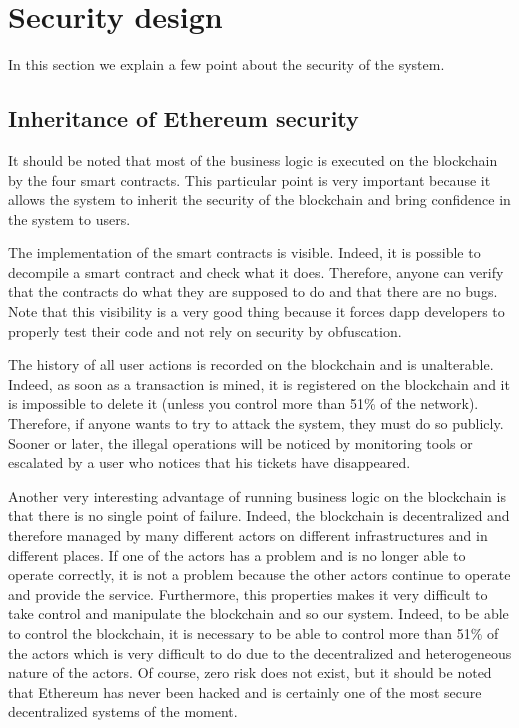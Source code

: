 \documentclass[a4paper,11pt,oneside]{report}
\begin{document}
\section{Security design}
In this section we explain a few point about the security of the system.

\subsection{Inheritance of Ethereum security}
It should be noted that most of the business logic is executed on the blockchain by the four smart contracts. This particular point is very important because it allows the system to inherit the security of the blockchain and bring confidence in the system to users.

The implementation of the smart contracts is visible. Indeed, it is possible to decompile a smart contract and check what it does. Therefore, anyone can verify that the contracts do what they are supposed to do and that there are no bugs. Note that this visibility is a very good thing because it forces dapp developers to properly test their code and not rely on security by obfuscation.

The history of all user actions is recorded on the blockchain and is unalterable. Indeed, as soon as a transaction is mined, it is registered on the blockchain and it is impossible to delete it (unless you control more than 51\% of the network). Therefore, if anyone wants to try to attack the system, they must do so publicly. Sooner or later, the illegal operations will be noticed by monitoring tools or escalated by a user who notices that his tickets have disappeared. 

Another very interesting advantage of running business logic on the blockchain is that there is no single point of failure. Indeed, the blockchain is decentralized and therefore managed by many different actors on different infrastructures and in different places. If one of the actors has a problem and is no longer able to operate correctly, it is not a problem because the other actors continue to operate and provide the service. Furthermore, this properties makes it very difficult to take control and manipulate the blockchain and so our system. Indeed, to be able to control the blockchain, it is necessary to be able to control more than 51\% of the actors which is very difficult to do due to the decentralized and heterogeneous nature of the actors. Of course, zero risk does not exist, but it should be noted that Ethereum has never been hacked and is certainly one of the most secure decentralized systems of the moment.
\end{document}
